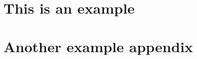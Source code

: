\section{This is an example}
\label{appendix:example1}

\pagebreak
\section{Another example appendix}
\label{appendix:example2}

